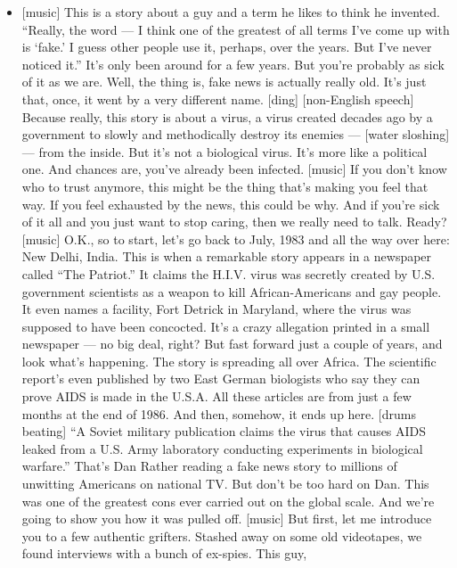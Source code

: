 \begin{itemize}
\tightlist
\item
  {[}music{]} This is a story about a guy and a term he likes to think
  he invented. ``Really, the word --- I think one of the greatest of all
  terms I've come up with is `fake.' I guess other people use it,
  perhaps, over the years. But I've never noticed it.'' It's only been
  around for a few years. But you're probably as sick of it as we are.
  Well, the thing is, fake news is actually really old. It's just that,
  once, it went by a very different name. {[}ding{]} {[}non-English
  speech{]} Because really, this story is about a virus, a virus created
  decades ago by a government to slowly and methodically destroy its
  enemies --- {[}water sloshing{]} --- from the inside. But it's not a
  biological virus. It's more like a political one. And chances are,
  you've already been infected. {[}music{]} If you don't know who to
  trust anymore, this might be the thing that's making you feel that
  way. If you feel exhausted by the news, this could be why. And if
  you're sick of it all and you just want to stop caring, then we really
  need to talk. Ready? {[}music{]} O.K., so to start, let's go back to
  July, 1983 and all the way over here: New Delhi, India. This is when a
  remarkable story appears in a newspaper called ``The Patriot.'' It
  claims the H.I.V. virus was secretly created by U.S. government
  scientists as a weapon to kill African-Americans and gay people. It
  even names a facility, Fort Detrick in Maryland, where the virus was
  supposed to have been concocted. It's a crazy allegation printed in a
  small newspaper --- no big deal, right? But fast forward just a couple
  of years, and look what's happening. The story is spreading all over
  Africa. The scientific report's even published by two East German
  biologists who say they can prove AIDS is made in the U.S.A. All these
  articles are from just a few months at the end of 1986. And then,
  somehow, it ends up here. {[}drums beating{]} ``A Soviet military
  publication claims the virus that causes AIDS leaked from a U.S. Army
  laboratory conducting experiments in biological warfare.'' That's Dan
  Rather reading a fake news story to millions of unwitting Americans on
  national TV. But don't be too hard on Dan. This was one of the
  greatest cons ever carried out on the global scale. And we're going to
  show you how it was pulled off. {[}music{]} But first, let me
  introduce you to a few authentic grifters. Stashed away on some old
  videotapes, we found interviews with a bunch of ex-spies. This guy,

\end{itemize}
